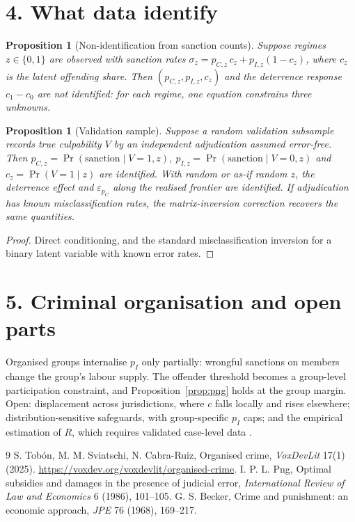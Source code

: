 \documentclass[11pt]{article}
\newtheorem{proposition}[theorem]{Proposition}
\theoremstyle{definition}
\begin{document}
\section*{4. What data identify}
\begin{proposition}[Non-identification from sanction counts]\label{prop:nonid}
Suppose regimes $z\in\{0,1\}$ are observed with sanction rates $\sigma_z=p_{C,z}\,c_z+p_{I,z}(1-c_z)$, where $c_z$ is the
latent offending share. Then $(p_{C,z},p_{I,z},c_z)$ and the deterrence response $c_1-c_0$ are not identified: for each
regime, one equation constrains three unknowns.
\end{proposition}
\begin{proposition}[Validation sample]\label{prop:val}
Suppose a random validation subsample records true culpability $V$ by an independent adjudication assumed error-free.
Then $p_{C,z}=\Pr(\text{sanction}\mid V=1,z)$, $p_{I,z}=\Pr(\text{sanction}\mid V=0,z)$ and $c_z=\Pr(V=1\mid z)$ are
identified. With random or as-if random $z$, the deterrence effect and $\varepsilon_{p_C}$ along the realised frontier are
identified. If adjudication has known misclassification rates, the matrix-inversion correction recovers the same quantities.
\end{proposition}
\begin{proof}
Direct conditioning, and the standard misclassification inversion for a binary latent variable with known error rates.
\end{proof}

\section*{5. Criminal organisation and open parts}
Organised groups internalise $p_I$ only partially: wrongful sanctions on members change the group's labour supply. The
offender threshold becomes a group-level participation constraint, and Proposition~\ref{prop:png} holds at the group
margin. Open: displacement across jurisdictions, where $c$ falls locally and rises elsewhere; distribution-sensitive
safeguards, with group-specific $p_I$ caps; and the empirical estimation of $R$, which requires validated case-level data
\cite{tsc}.

\begin{thebibliography}{9}
 S. Tob\'on, M. M. Sviatschi, N. Cabra-Ruiz, Organised crime, \emph{VoxDevLit} 17(1) (2025). \url{https://voxdev.org/voxdevlit/organised-crime}.
 I. P. L. Png, Optimal subsidies and damages in the presence of judicial error, \emph{International Review of Law and Economics} 6 (1986), 101--105.
 G. S. Becker, Crime and punishment: an economic approach, \emph{JPE} 76 (1968), 169--217.
\end{thebibliography}
\end{document}
